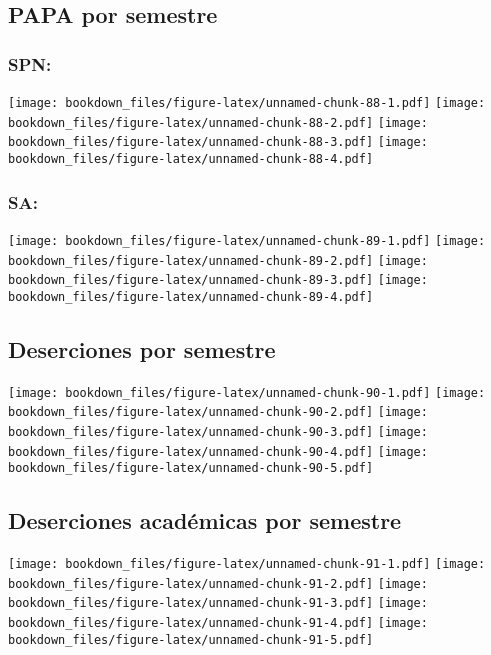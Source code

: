\documentclass[]{article}
\theoremstyle{definition}
\theoremstyle{definition}
\theoremstyle{definition}
\theoremstyle{remark}
\begin{document}
\subsection{PAPA por semestre}\label{papa-por-semestre-1}

\subsubsection{SPN:}\label{spn-4}

\texttt{[image: bookdown\_files/figure-latex/unnamed-chunk-88-1.pdf]}
\texttt{[image: bookdown\_files/figure-latex/unnamed-chunk-88-2.pdf]}
\texttt{[image: bookdown\_files/figure-latex/unnamed-chunk-88-3.pdf]}
\texttt{[image: bookdown\_files/figure-latex/unnamed-chunk-88-4.pdf]}

\subsubsection{SA:}\label{sa-4}

\texttt{[image: bookdown\_files/figure-latex/unnamed-chunk-89-1.pdf]}
\texttt{[image: bookdown\_files/figure-latex/unnamed-chunk-89-2.pdf]}
\texttt{[image: bookdown\_files/figure-latex/unnamed-chunk-89-3.pdf]}
\texttt{[image: bookdown\_files/figure-latex/unnamed-chunk-89-4.pdf]}

\subsection{Deserciones por semestre}\label{deserciones-por-semestre-1}

\texttt{[image: bookdown\_files/figure-latex/unnamed-chunk-90-1.pdf]}
\texttt{[image: bookdown\_files/figure-latex/unnamed-chunk-90-2.pdf]}
\texttt{[image: bookdown\_files/figure-latex/unnamed-chunk-90-3.pdf]}
\texttt{[image: bookdown\_files/figure-latex/unnamed-chunk-90-4.pdf]}
\texttt{[image: bookdown\_files/figure-latex/unnamed-chunk-90-5.pdf]}

\subsection{Deserciones académicas por
semestre}\label{deserciones-academicas-por-semestre-1}

\texttt{[image: bookdown\_files/figure-latex/unnamed-chunk-91-1.pdf]}
\texttt{[image: bookdown\_files/figure-latex/unnamed-chunk-91-2.pdf]}
\texttt{[image: bookdown\_files/figure-latex/unnamed-chunk-91-3.pdf]}
\texttt{[image: bookdown\_files/figure-latex/unnamed-chunk-91-4.pdf]}
\texttt{[image: bookdown\_files/figure-latex/unnamed-chunk-91-5.pdf]}
\end{document}
